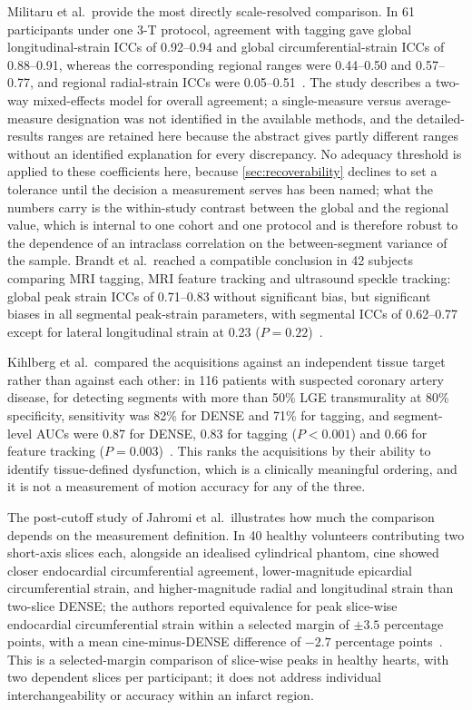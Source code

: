 Militaru et al.\ provide the most directly scale-resolved comparison. In 61 participants under one
3-T protocol, agreement with tagging gave global longitudinal-strain ICCs of 0.92--0.94 and global
circumferential-strain ICCs of 0.88--0.91, whereas the corresponding regional ranges were 0.44--0.50
and 0.57--0.77, and regional radial-strain ICCs were 0.05--0.51~\citep[Detailed Results and
Fig.~5]{militaru2021}. The study describes a two-way mixed-effects model for overall agreement; a
single-measure versus average-measure designation was not identified in the available methods, and
the detailed-results ranges are retained here because the abstract gives partly different ranges
without an identified explanation for every discrepancy. No adequacy threshold is applied to these
coefficients here, because \cref{sec:recoverability} declines to set a tolerance until the decision a
measurement serves has been named; what the numbers carry is the within-study contrast between the
global and the regional value, which is internal to one cohort and one protocol and is therefore
robust to the dependence of an intraclass correlation on the between-segment variance of the sample.
Brandt et al.\ reached a compatible
conclusion in 42 subjects comparing MRI tagging, MRI feature tracking and ultrasound speckle
tracking: global peak strain ICCs of 0.71--0.83 without significant bias, but significant biases in
all segmental peak-strain parameters, with segmental ICCs of 0.62--0.77 except for lateral
longitudinal strain at 0.23 ($P=0.22$)~\citep{brandt2024}.

Kihlberg et al.\ compared the acquisitions against an independent tissue target rather than against
each other: in 116 patients with suspected coronary artery disease, for detecting segments with more
than 50\% LGE transmurality at 80\% specificity, sensitivity was 82\% for DENSE and 71\% for
tagging, and segment-level AUCs were 0.87 for DENSE, 0.83 for tagging ($P<0.001$) and 0.66 for
feature tracking ($P=0.003$)~\citep{kihlberg2020}. This ranks the acquisitions by their ability to
identify tissue-defined dysfunction, which is a clinically meaningful ordering, and it is not a
measurement of motion accuracy for any of the three.

The post-cutoff study of Jahromi et al.\ illustrates how much the comparison depends on the
measurement definition. In 40 healthy volunteers contributing two short-axis slices each, alongside
an idealised cylindrical phantom, cine showed closer endocardial circumferential agreement,
lower-magnitude epicardial circumferential strain, and higher-magnitude radial and longitudinal
strain than two-slice DENSE; the authors reported equivalence for peak slice-wise endocardial
circumferential strain within a selected margin of $\pm3.5$ percentage points, with a mean
cine-minus-DENSE difference of $-2.7$ percentage points~\citep{jahromi2026densecine}. This is a
selected-margin comparison of slice-wise peaks in healthy hearts, with two dependent slices per
participant; it does not address individual interchangeability or accuracy within an infarct region.

